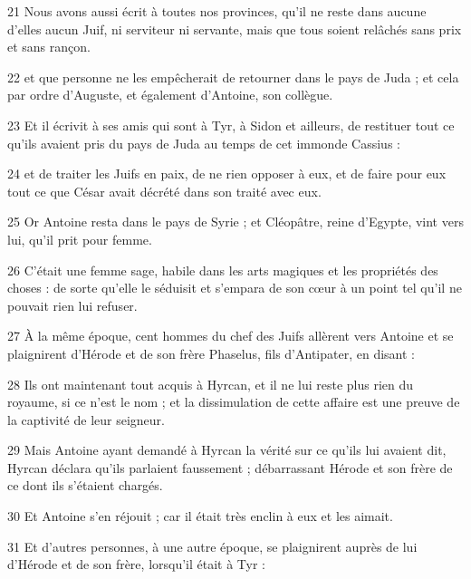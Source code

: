 \par 21 Nous avons aussi écrit à toutes nos provinces, qu'il ne reste dans aucune d'elles aucun Juif, ni serviteur ni servante, mais que tous soient relâchés sans prix et sans rançon.

\par 22 et que personne ne les empêcherait de retourner dans le pays de Juda ; et cela par ordre d'Auguste, et également d'Antoine, son collègue.

\par 23 Et il écrivit à ses amis qui sont à Tyr, à Sidon et ailleurs, de restituer tout ce qu'ils avaient pris du pays de Juda au temps de cet immonde Cassius :

\par 24 et de traiter les Juifs en paix, de ne rien opposer à eux, et de faire pour eux tout ce que César avait décrété dans son traité avec eux.

\par 25 Or Antoine resta dans le pays de Syrie ; et Cléopâtre, reine d'Egypte, vint vers lui, qu'il prit pour femme.

\par 26 C'était une femme sage, habile dans les arts magiques et les propriétés des choses : de sorte qu'elle le séduisit et s'empara de son cœur à un point tel qu'il ne pouvait rien lui refuser.

\par 27 À la même époque, cent hommes du chef des Juifs allèrent vers Antoine et se plaignirent d'Hérode et de son frère Phaselus, fils d'Antipater, en disant :

\par 28 Ils ont maintenant tout acquis à Hyrcan, et il ne lui reste plus rien du royaume, si ce n'est le nom ; et la dissimulation de cette affaire est une preuve de la captivité de leur seigneur.

\par 29 Mais Antoine ayant demandé à Hyrcan la vérité sur ce qu'ils lui avaient dit, Hyrcan déclara qu'ils parlaient faussement ; débarrassant Hérode et son frère de ce dont ils s'étaient chargés.

\par 30 Et Antoine s'en réjouit ; car il était très enclin à eux et les aimait.

\par 31 Et d'autres personnes, à une autre époque, se plaignirent auprès de lui d'Hérode et de son frère, lorsqu'il était à Tyr :

